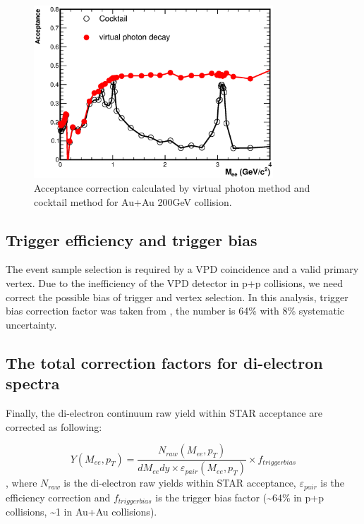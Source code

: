 \begin{figure}
\begin{centering}
\includegraphics[width=0.8\textwidth]{fig/3.Analysis/Efficiency/Acceptance_mass}
\par\end{centering}

\protect\caption{Acceptance correction calculated by virtual photon method and cocktail
method for Au+Au 200GeV collision.}


\label{fig:eff acc}
\end{figure}



\subsection{Trigger efficiency and trigger bias}

The event sample selection is required by a VPD coincidence and a
valid primary vertex. Due to the inefficiency of the VPD detector
in p+p collisions, we need correct the possible bias of trigger and
vertex selection. In this analysis, trigger bias correction factor
was taken from \cite{PhysRevC.86.024906}, the number is 64\% with
8\% systematic uncertainty.


\subsection{The total correction factors for di-electron spectra}

Finally, the di-electron continuum raw yield within STAR acceptance
are corrected as following:

\begin{equation}
Y(M_{ee},p_{T})=\frac{N_{raw}(M_{ee},p_{T})}{dM_{ee}dy\times\varepsilon_{pair}(M_{ee},p_{T})}\times f_{triggerbias}\label{eq:yield correction}
\end{equation}
, where $N_{raw}$ is the di-electron raw yields within STAR acceptance,
$\varepsilon_{pair}$ is the efficiency correction and $f_{triggerbias}$
is the trigger bias factor (\textasciitilde{}64\% in p+p collisions,
\textasciitilde{}1 in Au+Au collisions).


